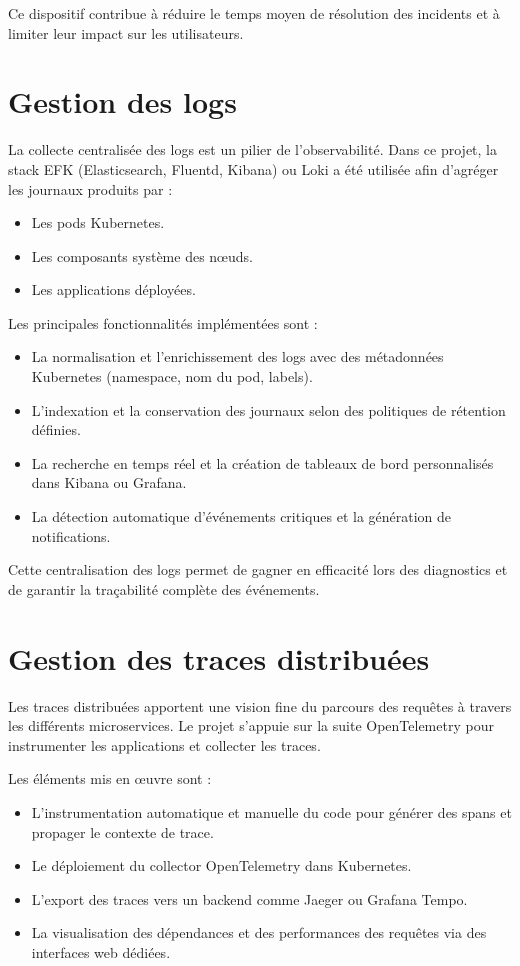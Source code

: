 Ce dispositif contribue à réduire le temps moyen de résolution des incidents et à limiter leur impact sur les utilisateurs.

\section{Gestion des logs}

La collecte centralisée des logs est un pilier de l’observabilité.
Dans ce projet, la stack EFK (Elasticsearch, Fluentd, Kibana) ou Loki a été utilisée afin d’agréger les journaux produits par :
\begin{itemize}
	\item Les pods Kubernetes.
	\item Les composants système des nœuds.
	\item Les applications déployées.
\end{itemize}

Les principales fonctionnalités implémentées sont :
\begin{itemize}
	\item La normalisation et l’enrichissement des logs avec des métadonnées Kubernetes (namespace, nom du pod, labels).
	\item L’indexation et la conservation des journaux selon des politiques de rétention définies.
	\item La recherche en temps réel et la création de tableaux de bord personnalisés dans Kibana ou Grafana.
	\item La détection automatique d’événements critiques et la génération de notifications.
\end{itemize}

Cette centralisation des logs permet de gagner en efficacité lors des diagnostics et de garantir la traçabilité complète des événements.

\section{Gestion des traces distribuées}

Les traces distribuées apportent une vision fine du parcours des requêtes à travers les différents microservices.
Le projet s’appuie sur la suite OpenTelemetry pour instrumenter les applications et collecter les traces.

Les éléments mis en œuvre sont :
\begin{itemize}
	\item L’instrumentation automatique et manuelle du code pour générer des spans et propager le contexte de trace.
	\item Le déploiement du collector OpenTelemetry dans Kubernetes.
	\item L’export des traces vers un backend comme Jaeger ou Grafana Tempo.
	\item La visualisation des dépendances et des performances des requêtes via des interfaces web dédiées.
\end{itemize}

